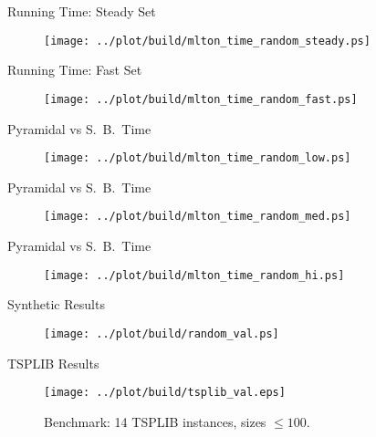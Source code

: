 \documentclass[
  size=8pt,
  style=klope,
  paper=screen,
  pauseslide,
  nopagebreaks,
  hlsections,
  fleqn
]{powerdot}
\begin{document}
\begin{slide}[toc=Running Time]{Running Time: Steady Set}
  \begin{figure}[H]
    \centering
      \texttt{[image: ../plot/build/mlton\_time\_random\_steady.ps]}
  \end{figure}
\end{slide}
\begin{slide}[toc=]{Running Time: Fast Set}
  \begin{figure}[H]
    \centering
      \texttt{[image: ../plot/build/mlton\_time\_random\_fast.ps]}
  \end{figure}
\end{slide}
\begin{slide}[toc=]{Pyramidal vs S.\ B.\ Time}
  \begin{figure}[H]
    \centering
      \texttt{[image: ../plot/build/mlton\_time\_random\_low.ps]}
  \end{figure}
\end{slide}
\begin{slide}[toc=]{Pyramidal vs S.\ B.\ Time}
  \begin{figure}[H]
    \centering
      \texttt{[image: ../plot/build/mlton\_time\_random\_med.ps]}
  \end{figure}
\end{slide}
\begin{slide}[toc=]{Pyramidal vs S.\ B.\ Time}
  \begin{figure}[H]
    \centering
      \texttt{[image: ../plot/build/mlton\_time\_random\_hi.ps]}
  \end{figure}
\end{slide}

\begin{slide}[toc=Tours Computed]{Synthetic Results}
  \begin{figure}[H]
    \centering
    \texttt{[image: ../plot/build/random\_val.ps]}
  \end{figure}
\end{slide}

\begin{slide}[toc=]{TSPLIB Results}
  \begin{figure}[H]
    \centering
    \texttt{[image: ../plot/build/tsplib\_val.eps]}
    \caption{Benchmark: 14 TSPLIB instances, sizes $\leq 100$.}
  \end{figure}
\end{slide}
\end{document}
